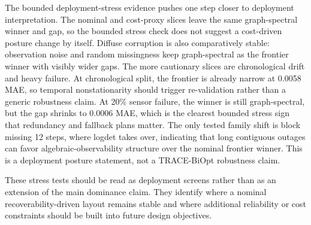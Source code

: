 
The bounded deployment-stress evidence pushes one step closer to deployment
interpretation. The nominal and cost-proxy slices leave the same graph-spectral
winner and gap, so the bounded stress check does not suggest a cost-driven
posture change by itself. Diffuse corruption is also comparatively stable:
observation noise and random missingness keep graph-spectral as the frontier
winner with visibly wider gaps. The more cautionary slices are chronological
drift and heavy failure. At chronological split, the frontier is already narrow
at 0.0058 MAE, so temporal nonstationarity should trigger re-validation rather
than a generic robustness claim. At 20\% sensor failure, the winner is still
graph-spectral, but the gap shrinks to 0.0006 MAE, which is the clearest
bounded stress sign that redundancy and fallback plans matter. The only tested
family shift is block missing 12 steps, where logdet takes over, indicating
that long contiguous outages can favor algebraic-observability structure over
the nominal frontier winner. This is a deployment posture statement, not a
TRACE-BiOpt robustness claim.

These stress tests should be read as deployment screens rather than as an
extension of the main dominance claim. They identify where a nominal
recoverability-driven layout remains stable and where additional reliability or
cost constraints should be built into future design objectives.
